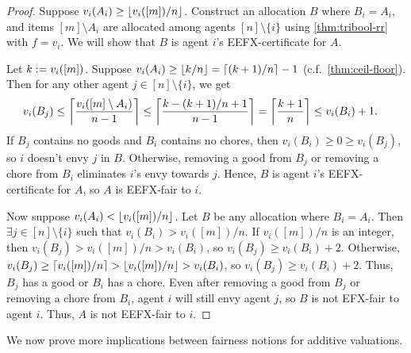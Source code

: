 
\begin{proof}
Suppose $v_i(A_i) \ge \lfloor v_i([m])/n \rfloor$.
Construct an allocation $B$ where $B_i = A_i$, and items $[m] \setminus A_i$
are allocated among agents $[n] \setminus \{i\}$ using \cref{thm:tribool-rr} with $f = v_i$.
We will show that $B$ is agent $i$'s EEFX-certificate for $A$.

Let $k := v_i([m])$.
Suppose $v_i(A_i) \ge \lfloor k/n \rfloor = \lceil (k+1)/n \rceil - 1$ (c.f.~\cref{thm:ceil-floor}).
Then for any other agent $j \in [n] \setminus \{i\}$, we get
\begin{align*}
v_i(B_j) &\le \left\lceil \frac{v_i([m] \setminus A_i)}{n-1} \right\rceil
    \le \left\lceil \frac{k - (k+1)/n + 1}{n-1} \right\rceil
    \relax= \left\lceil \frac{k+1}{n} \right\rceil \le v_i(B_i) + 1.
\end{align*}
If $B_j$ contains no goods and $B_i$ contains no chores,
then $v_i(B_i) \ge 0 \ge v_i(B_j)$, so $i$ doesn't envy $j$ in $B$.
Otherwise, removing a good from $B_j$ or removing a chore from $B_i$
eliminates $i$'s envy towards $j$.
Hence, $B$ is agent $i$'s EEFX-certificate for $A$, so $A$ is EEFX-fair to $i$.

Now suppose $v_i(A_i) < \lfloor v_i([m])/n \rfloor$. Let $B$ be any allocation where $B_i = A_i$.
Then $\exists j \in [n] \setminus \{i\}$ such that $v_i(B_i) > v_i([m])/n$.
If $v_i([m])/n$ is an integer, then $v_i(B_j) > v_i([m])/n > v_i(B_i)$, so $v_i(B_j) \ge v_i(B_i) + 2$.
Otherwise, $v_i(B_j) \ge \lceil v_i([m])/n \rceil > \lfloor v_i([m])/n \rfloor > v_i(B_i)$, so $v_i(B_j) \ge v_i(B_i) + 2$.
Thus, $B_j$ has a good or $B_i$ has a chore.
Even after removing a good from $B_j$ or removing a chore from $B_i$,
agent $i$ will still envy agent $j$, so $B$ is not EFX-fair to agent $i$.
Thus, $A$ is not EEFX-fair to $i$.
\end{proof}

We now prove more implications between fairness notions for additive valuations.

